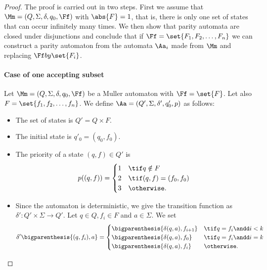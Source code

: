 \begin{proof}
    The proof is carried out in two steps.
    First we assume that $\Mm = (Q, \Sigma, \delta, q_0, \Ff)$
    with $\abs{F} = 1$, that is, there is only one set
    of states that can occur infinitely many times.
    We then show that parity automata are closed under disjunctions
    and conclude that if $\Ff = \set{F_1, F_2, \dots, F_n}$
    we can construct a parity automaton from the automata
    $\Aa_i$ made from $\Mm$ and replacing $\Ff by \set{F_i}$.

    \paragraph*{Case of one accepting subset}
    Let $\Mm = (Q, \Sigma, \delta, q_0, \Ff)$ be a Muller automaton
    with $\Ff = \set{F}$. Let also $F = \set{f_1, f_2, \dots, f_n}$.
    We define $\Aa = (Q', \Sigma, \delta', q'_0, p)$ as follows:
    \begin{itemize}
        \item The set of states is $Q' = Q \times F$.
        \item The initial state is $q'_0 = (q_0, f_0)$.
        \item The priority of a state $(q, f) \in Q'$ is \[
            p((q, f)) = \begin{cases}
                1 & \tif q \notin F \\
                2 & \tif (q, f) = (f_0, f_0) \\
                3 & \otherwise.
            \end{cases}
        \]
        \item Since the automaton is deterministic, we give the transition
            function as $\delta': Q' \times \Sigma \to Q'$. Let $q \in Q, f_i \in F$
            and $a \in \Sigma$. We set \[
            \delta'\bigparenthesis{(q, f_i), a} = \begin{cases}
                \bigparenthesis{\delta(q, a), f_{i+1}} & \tif q = f_i \andd i < k \\
                \bigparenthesis{\delta(q, a), f_0} & \tif q = f_i \andd i = k \\
                \bigparenthesis{\delta(q, a), f_i} & \otherwise.
            \end{cases}
        \]
    \end{itemize}


\end{proof}
